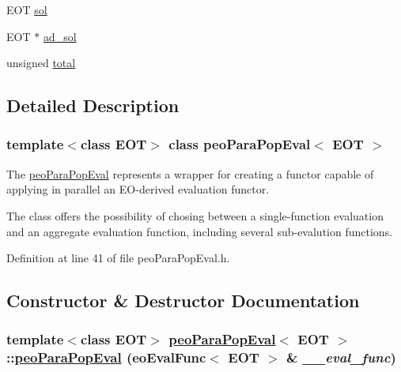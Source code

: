 \begin{CompactItemize}
\item 
\hypertarget{classpeoParaPopEval_fb6941e0455515a908eb82342b995163}{
EOT \hyperlink{classpeoParaPopEval_fb6941e0455515a908eb82342b995163}{sol}}
\label{classpeoParaPopEval_fb6941e0455515a908eb82342b995163}

\item 
\hypertarget{classpeoParaPopEval_60cafeab376262af675fdff43434c8d8}{
EOT $\ast$ \hyperlink{classpeoParaPopEval_60cafeab376262af675fdff43434c8d8}{ad\_\-sol}}
\label{classpeoParaPopEval_60cafeab376262af675fdff43434c8d8}

\item 
\hypertarget{classpeoParaPopEval_b528ad9dd9006c3dd57f149a3843e57d}{
unsigned \hyperlink{classpeoParaPopEval_b528ad9dd9006c3dd57f149a3843e57d}{total}}
\label{classpeoParaPopEval_b528ad9dd9006c3dd57f149a3843e57d}

\end{CompactItemize}


\subsection{Detailed Description}
\subsubsection*{template$<$class EOT$>$ class peo\-Para\-Pop\-Eval$<$ EOT $>$}

The \hyperlink{classpeoParaPopEval}{peo\-Para\-Pop\-Eval} represents a wrapper for creating a functor capable of applying in parallel an EO-derived evaluation functor. 

The class offers the possibility of chosing between a single-function evaluation and an aggregate evaluation function, including several sub-evalution functions. 



Definition at line 41 of file peo\-Para\-Pop\-Eval.h.

\subsection{Constructor \& Destructor Documentation}
\hypertarget{classpeoParaPopEval_bcb540510a7038520bec41a7af332daf}{
\subsubsection[peoParaPopEval]{\setlength{\rightskip}{0pt plus 5cm}template$<$class EOT$>$ \hyperlink{classpeoParaPopEval}{peo\-Para\-Pop\-Eval}$<$ EOT $>$::\hyperlink{classpeoParaPopEval}{peo\-Para\-Pop\-Eval} (eo\-Eval\-Func$<$ EOT $>$ \& {\em \_\-\_\-eval\_\-func})}}
\label{classpeoParaPopEval_bcb540510a7038520bec41a7af332daf}


